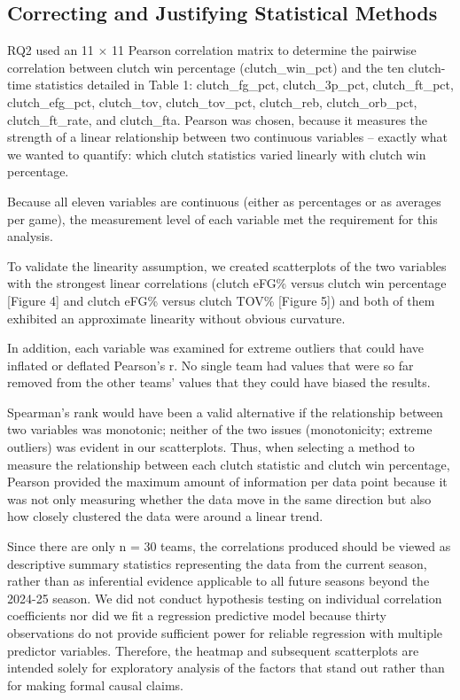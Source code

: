 \subsection{Correcting and Justifying Statistical Methods}

\begin{sloppypar}
RQ2 used an 11 $\times$ 11 Pearson correlation matrix to determine the pairwise correlation between clutch win percentage (clutch\_win\_pct) and the ten clutch-time statistics detailed in Table 1: clutch\_fg\_pct, clutch\_3p\_pct, clutch\_ft\_pct, clutch\_efg\_pct, clutch\_tov, clutch\_tov\_pct, clutch\_reb, clutch\_orb\_pct, clutch\_ft\_rate, and clutch\_fta. Pearson was chosen, because it measures the strength of a linear relationship between two continuous variables -- exactly what we wanted to quantify: which clutch statistics varied linearly with clutch win percentage.

Because all eleven variables are continuous (either as percentages or as averages per game), the measurement level of each variable met the requirement for this analysis.

To validate the linearity assumption, we created scatterplots of the two variables with the strongest linear correlations (clutch eFG\% versus clutch win percentage [Figure 4] and clutch eFG\% versus clutch TOV\% [Figure 5]) and both of them exhibited an approximate linearity without obvious curvature.

In addition, each variable was examined for extreme outliers that could have inflated or deflated Pearson's r. No single team had values that were so far removed from the other teams' values that they could have biased the results.

Spearman's rank would have been a valid alternative if the relationship between two variables was monotonic; neither of the two issues (monotonicity; extreme outliers) was evident in our scatterplots. Thus, when selecting a method to measure the relationship between each clutch statistic and clutch win percentage, Pearson provided the maximum amount of information per data point because it was not only measuring whether the data move in the same direction but also how closely clustered the data were around a linear trend.

Since there are only n = 30 teams, the correlations produced should be viewed as descriptive summary statistics representing the data from the current season, rather than as inferential evidence applicable to all future seasons beyond the 2024-25 season. We did not conduct hypothesis testing on individual correlation coefficients nor did we fit a regression predictive model because thirty observations do not provide sufficient power for reliable regression with multiple predictor variables. Therefore, the heatmap and subsequent scatterplots are intended solely for exploratory analysis of the factors that stand out rather than for making formal causal claims.
\end{sloppypar}

